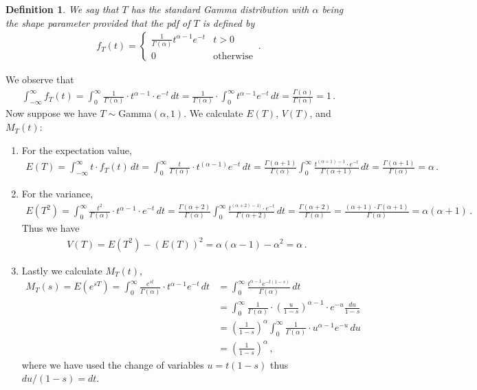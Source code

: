 \documentclass[11pt,oneside]{book}
\theoremstyle{newStyle}
\newtheorem{defn}[thm]{Definition}
\begin{document}
\begin{defn}
We say that $T$ has the standard Gamma distribution with $\alpha$ being the shape parameter provided that the pdf of $T$ is defined by
\begin{align*}
f_T(t) = \begin{cases}
\frac{1}{\Gamma(\alpha)}t^{\alpha-1} e^{-t} & t>0\\
0 &\text{otherwise}
\end{cases}\,.
\end{align*}
\end{defn}
We observe that 
\begin{align*}
\int_{-\infty}^\infty f_T(t) = \int_0^{\infty}\frac{1}{\Gamma(\alpha)}\cdot t^{\alpha-1} \cdot e^{-t}\, dt = \frac{1}{\Gamma(\alpha)}\cdot \int_0^\infty t^{\alpha-1} e^{-t}\, dt = \frac{\Gamma(\alpha)}{\Gamma(\alpha)} = 1
\,.
\end{align*}
Now suppose we have $T \sim$Gamma$(\alpha,1)$. We calculate $E(T)$, $V(T)$, and $M_T(t)$:
\begin{enumerate}
\item For the expectation value,
\begin{align*}
E(T) = \int_{-\infty}^\infty t\cdot f_T(t) \,dt = \int_0^\infty \frac{t}{\Gamma(\alpha)}\cdot t^{(\alpha-1)}e^{-t}\, dt = \frac{\Gamma(\alpha+1)}{\Gamma(\alpha)}\int_0^\infty \frac{t^{(\alpha+1)-1}\cdot e^{-t}}{\Gamma(\alpha+1)}\, dt = \frac{\Gamma(\alpha+1)}{\Gamma(\alpha)} = \alpha\,.
\end{align*}
\item For the variance,
\begin{align*}
E(T^2) = \int_0^\infty \frac{t^2}{\Gamma(\alpha)}\cdot t^{\alpha-1}\cdot e^{-t}\, dt = \frac{\Gamma(\alpha+2)}{\Gamma(\alpha)} \int_0^\infty \frac{t^{(\alpha+2)-1)}\cdot e^{-t}}{\Gamma(\alpha+2)}\, dt = \frac{\Gamma(\alpha+2)}{\Gamma(\alpha)} = \frac{(\alpha+1)\cdot \Gamma(\alpha+1)}{\Gamma(\alpha)} = \alpha(\alpha+1)\,.
\end{align*}
Thus we have
\begin{align*}
V(T) = E(T^2) - (E(T))^2 = \alpha(\alpha-1)-\alpha^2 = \alpha\,.
\end{align*}
\item Lastly we calculate $M_T(t)$,
\begin{align*}
M_T(s) = E(e^{sT}) = \int_{0}^\infty \frac{e^{st}}{\Gamma(\alpha)}\cdot t^{\alpha-1}e^{-t}\, dt 
&= \int_0^\infty \frac{t^{\alpha-1}e^{-t(1-s)}}{\Gamma(\alpha)}\, dt \\
&= \int_0^\infty \frac{1}{\Gamma(\alpha)}\cdot\left( \frac{u}{1-s}\right)^{\alpha-1}\cdot e^{-u}\frac{du}{1-s}\\
&= \left( \frac{1}{1-s}\right)^\alpha \int_0^\infty \frac{1}{\Gamma(\alpha)}\cdot u^{\alpha-1} e^{-u}\, du \\
&= \left( \frac{1}{1-s}\right)^\alpha\,,
\end{align*}
where we have used the change of variables $u = t(1-s)$ thus $du/(1-s) = dt$. 
\end{enumerate}
\end{document}

